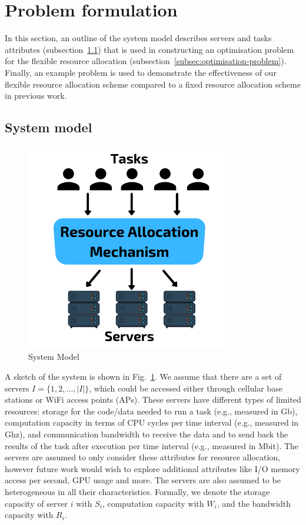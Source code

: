\section{Problem formulation}
\label{sec:problem-formulation}
In this section, an outline of the system model describes servers and tasks attributes (subsection~\ref{subsec:system-model})
that is used in constructing an optimisation problem for the flexible resource allocation
(subsection~\ref{subsec:optimisation-problem}). Finally, an example problem is used to demonstrate the effectiveness of
our flexible resource allocation scheme compared to a fixed resource allocation scheme in previous work.

\subsection{System model}\label{subsec:system-model}
\begin{figure}
    \centering
    \includegraphics[width=0.48\linewidth]{figs/system_model.pdf}
    \caption{System Model}
    \label{fig:system-model}
\end{figure}
A sketch of the system is shown in Fig.~\ref{fig:system-model}.
We assume that there are a set of servers $I = \{1,2,\ldots,\left|I\right|\}$, which could be accessed either through
cellular base stations or WiFi access points (APs). These servers have different types of limited resources:
storage for the code/data needed to run a task (e.g., measured in Gb), computation capacity in terms of CPU cycles per
time interval (e.g., measured in Ghz), and communication bandwidth to receive the data and to send back the results
of the task after execution per time interval (e.g., measured in Mbit). The servers are assumed to only consider these 
attributes for resource allocation, however future work would wish to explore additional attributes like I/O memory
access per second, GPU usage and more. The servers are also assumed to be heterogeneous in all their characteristics. 
Formally, we denote the storage capacity of server $i$ with $S_i$, computation capacity with $W_i$, and the 
bandwidth capacity with $R_i$.

